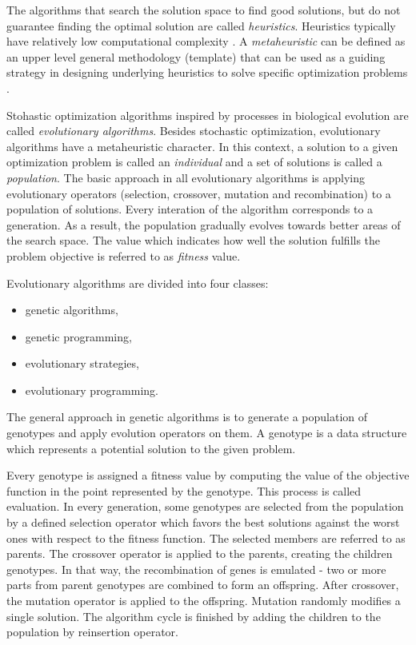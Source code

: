 The algorithms that search the solution space to find good solutions, but do not guarantee finding the optimal solution are called \textit{heuristics}. 
Heuristics typically have relatively low computational complexity \cite{cupic2013prirodom}.
A \textit{metaheuristic} can be defined as an upper level general methodology (template) that can be used as a guiding strategy in designing underlying heuristics to solve specific optimization problems \cite{talbi2009metaheuristics}.

Stohastic optimization algorithms inspired by processes in biological evolution are called \textit{evolutionary algorithms}.
Besides stochastic optimization, evolutionary algorithms have a metaheuristic character.
In this context, a solution to a given optimization problem is called an \textit{individual} and a set of solutions is called a \textit{population}.
The basic approach in all evolutionary algorithms is applying evolutionary operators (selection, crossover, mutation and recombination) to a population of solutions.
Every interation of the algorithm corresponds to a generation.
As a result, the population gradually evolves towards better areas of the search space. 
The value which indicates how well the solution fulfills the problem objective is referred to as \textit{fitness} value.

Evolutionary algorithms are divided into four classes: 
\begin{itemize}
    \item genetic algorithms,
    \item genetic programming,
    \item evolutionary strategies,
    \item evolutionary programming.
\end{itemize}

The general approach in genetic algorithms is to generate a population of genotypes and apply evolution operators on them.
A genotype is a data structure which represents a potential solution to the given problem.

Every genotype is assigned a fitness value by computing the value of the objective function in the point represented by the genotype.
This process is called evaluation.
In every generation, some genotypes are selected from the population by a defined selection operator which favors the best solutions against the worst ones with respect to the fitness function.
The selected members are referred to as parents.
The crossover operator is applied to the parents, creating the children genotypes.
In that way, the recombination of genes is emulated - two or more parts from parent genotypes are combined to form an offspring.
After crossover, the mutation operator is applied to the offspring.
Mutation randomly modifies a single solution.
The algorithm cycle is finished by adding the children to the population by reinsertion operator.

